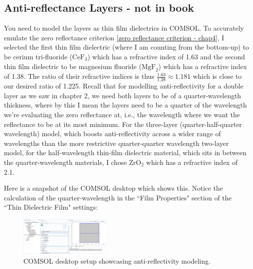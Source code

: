 
\subsection{Anti-reflectance Layers - not in book}

You need to model the layers as thin film dielectrics in COMSOL. To accurately emulate the zero reflectance criterion \ref{zero reflectance criterion - chap4}, I selected the first thin film dielectric (where I am counting from the bottom-up) to be cerium tri-fluoride ($\text{CeF}_3$) which has a refractive index of 1.63 and the second thin film dielectric to be magnesium fluoride ($\text{MgF}_2$) which has a refractive index of 1.38. The ratio of their refractive indices is thus $\frac{1.63}{1.38} \approx 1.181$ which is close to our desired ratio of 1.225. Recall that for modelling anti-reflectivity for a double layer as we saw in chapter 2, we need both layers to be of a quarter-wavelength thickness, where by this I mean the layers need to be a quarter of the wavelength we're evaluating the zero reflectance at, i.e., the wavelength where we want the reflectance to be at its most minimum. For the three-layer (quarter-half-quarter wavelength) model, which boosts anti-reflectivity across a wider range of wavelengths than the more restrictive quarter-quarter wavelength two-layer model, for the half-wavelength thin-film dielectric material, which sits in between the quarter-wavelength materials, I chose $\text{ZrO}_2$ which has a refractive index of 2.1.

Here is a snapshot of the COMSOL desktop which shows this. Notice the calculation of the quarter-wavelength in the ``Film Properties" section of the ``Thin Dielectric Film" settings:

\begin{figure}[ht!]
  \centering
  \includegraphics[width=0.4\textwidth]{Chapters/Figures/Chapter 4 Figures/COMSOL Desktop Showcasing Antireflectivity Setup.png}
  \caption{COMSOL desktop setup showcasing anti-reflectivity modeling.}
  \label{fig:COMSOL desktop showcasing antireflectivity}
\end{figure}

